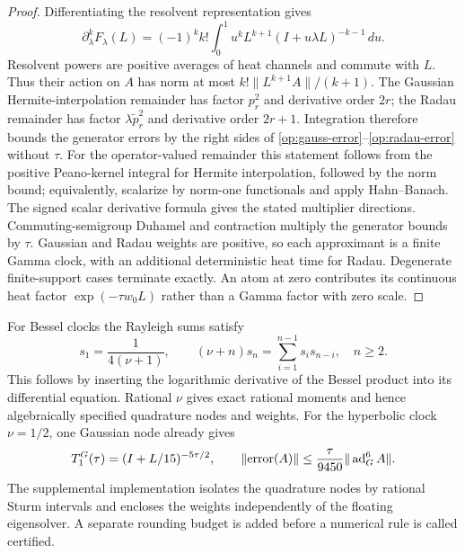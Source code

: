 \begin{proof}
Differentiating the resolvent representation gives
\[
 \partial_\lambda^kF_\lambda(L)
 =(-1)^kk!\int_0^1u^k L^{k+1}(I+u\lambda L)^{-k-1}\,du.
\]
Resolvent powers are positive averages of heat channels and commute with
$L$. Thus their action on $A$ has norm at most
$k!\|L^{k+1}A\|/(k+1)$. The Gaussian Hermite-interpolation remainder has
factor $p_r^2$ and derivative order $2r$; the Radau remainder has factor
$\lambda\widetilde p_r^2$ and derivative order $2r+1$.
Integration therefore bounds the generator errors by the right sides of
\eqref{op:gauss-error}--\eqref{op:radau-error} without $\tau$.
For the operator-valued remainder this statement follows from the positive
Peano-kernel integral for Hermite interpolation, followed by the norm bound;
equivalently, scalarize by norm-one functionals and apply Hahn--Banach.
The signed scalar derivative formula gives the stated multiplier directions.
Commuting-semigroup Duhamel and contraction multiply the generator bounds
by $\tau$. Gaussian and Radau weights are positive, so each approximant
is a finite Gamma clock, with an additional deterministic heat time for
Radau. Degenerate finite-support cases terminate exactly.
An atom at zero contributes its continuous heat factor
$\exp(-\tau w_0L)$ rather than a Gamma factor with zero scale.
\end{proof}

For Bessel clocks the Rayleigh sums satisfy
\begin{equation}
 s_1=\frac1{4(\nu+1)},\qquad
 (\nu+n)s_n=\sum_{i=1}^{n-1}s_i s_{n-i},\quad n\ge2.
 \label{op:rayleigh}
\end{equation}
This follows by inserting the logarithmic derivative of the Bessel product
into its differential equation. Rational $\nu$ gives exact rational moments
and hence algebraically specified quadrature nodes and weights. For the
hyperbolic clock $\nu=1/2$, one Gaussian node already gives
\begin{equation}
 T_1^G(\tau)=(I+L/15)^{-5\tau/2},\qquad
 \|\mathrm{error}(A)\|\le\frac{\tau}{9450}\|\operatorname{ad}_G^6A\|.
 \label{op:one-clock}
\end{equation}
The supplemental implementation isolates the quadrature nodes by rational
Sturm intervals and encloses the weights independently of the floating
eigensolver. A separate rounding budget is added before a numerical rule
is called certified.

